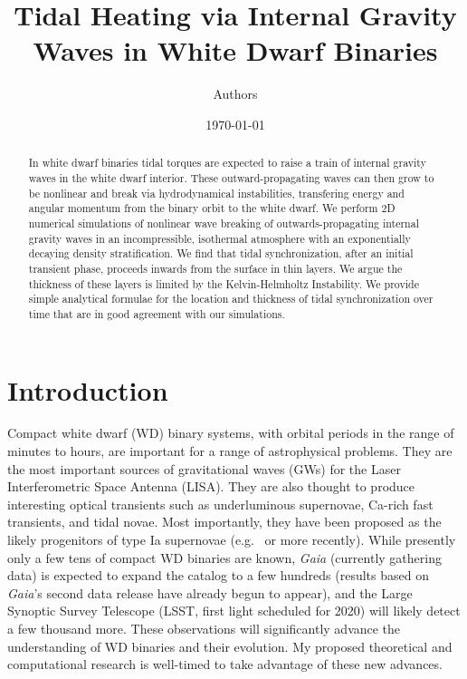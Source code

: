 \documentclass[twocolumn,
        nofootinbib, %
        usenames, %
        aps,
        prd,
        dvipsnames %
    ]{revtex4-1}%
\begin{document}
\def\Snospace~{\S{}} %
\renewcommand*{\sectionautorefname}{\Snospace}
\renewcommand*{\appendixautorefname}{\Snospace}
\renewcommand*{\figureautorefname}{Fig.}
\renewcommand*{\equationautorefname}{Eq.}
\renewcommand*{\tableautorefname}{Tab.}

\begin{abstract}
    In white dwarf binaries tidal torques are expected to raise a train of
    internal gravity waves in the white dwarf interior. These
    outward-propagating waves can then grow to be nonlinear and break via
    hydrodynamical instabilities, transfering energy and angular momentum from
    the binary orbit to the white dwarf. We perform 2D numerical simulations of
    nonlinear wave breaking of outwards-propagating internal gravity waves in an
    incompressible, isothermal atmosphere with an exponentially decaying density
    stratification. We find that tidal synchronization, after an initial
    transient phase, proceeds inwards from the surface in thin layers. We argue
    the thickness of these layers is limited by the Kelvin-Helmholtz
    Instability. We provide simple analytical formulae for the location and
    thickness of tidal synchronization over time that are in good agreement with
    our simulations.
\end{abstract}

\title{Tidal Heating via Internal Gravity Waves in White Dwarf Binaries}
\author{Authors}
\date{\today}
\maketitle

\section{Introduction}

Compact white dwarf (WD) binary systems, with orbital periods in the range of
minutes to hours, are important for a range of astrophysical problems. They are
the most important sources of gravitational waves (GWs) for the Laser
Interferometric Space Antenna (LISA)\cite{lisa}. They are also thought to
produce interesting optical transients such as underluminous
supernovae\cite{underlum}, Ca-rich fast transients\cite{carich}, and tidal
novae\cite{tidal_novae}. Most importantly, they have been proposed as the likely
progenitors of type Ia supernovae (e.g.~\cite{Ia0,webbink} or more
recently\cite{Ia1,Ia2}). While presently only a few tens of compact WD binaries
are known\cite{lsst_wd}, \emph{Gaia} (currently gathering data) is expected to
expand the catalog to a few hundreds\cite{lsst_wd} (results based on
\emph{Gaia}'s second data release have already begun to
appear\cite{gaiaDD,gaiaDD2}), and the Large Synoptic Survey Telescope (LSST,
first light scheduled for 2020) will likely detect a few thousand
more\cite{lsst_wd}. These observations will significantly advance the
understanding of WD binaries and their evolution. My proposed theoretical and
computational research is well-timed to take advantage of these new advances.
\end{document}
